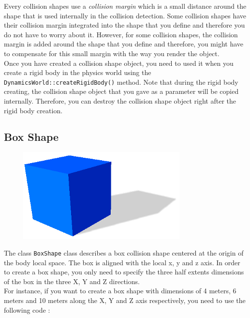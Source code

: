 \documentclass[a4paper,12pt]{article}
\begin{document}
    Every collision shapes use a \emph{collision margin} which is a small distance around the shape that is used internally in the collision detection.
    Some collision shapes have their collision margin integrated into the shape that you define and therefore you do not have to worry about it.
    However, for some collision shapes, the collision margin is added around the shape that you define and therefore, you might have to compensate
    for this small margin with the way you render the object. \\

    Once you have created a collision shape object, you need to used it when you create a rigid body in the physics world using the
    \texttt{DynamicsWorld::createRigidBody()} method. Note that during the rigid body creating, the collision shape object that you gave as a parameter
    will be copied internally. Therefore, you can destroy the collision shape object right after the rigid body creation.

    \subsection{Box Shape}

    \begin{figure}[h]
        \centering
        \includegraphics{boxshape.png}
        \label{fig:boxshape}
    \end{figure}

    The class \texttt{BoxShape} class describes a box collision shape centered at the origin of the body local space. The box is aligned with the local x, y and z axis.
    In order to create a box shape, you only need to specify the three half extents dimensions of the box in the three X, Y and Z directions. \\

    For instance, if you want to create a box shape with dimensions of 4 meters, 6 meters and 10 meters along the X, Y and Z axis respectively, you need to use the following code : \\
\end{document}
